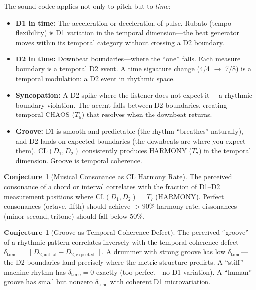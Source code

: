 \documentclass[11pt]{article}
\theoremstyle{definition}
\newtheorem{conjecture}[theorem]{Conjecture}
\theoremstyle{remark}
\begin{document}
The sound codec applies not only to pitch but to \emph{time}:

\begin{itemize}[nosep]
  \item \textbf{D1 in time:} The acceleration or deceleration of pulse.  Rubato
    (tempo flexibility) is D1 variation in the temporal dimension---the beat generator
    moves within its temporal category without crossing a D2 boundary.
  \item \textbf{D2 in time:} Downbeat boundaries---where the ``one'' falls.  Each
    measure boundary is a temporal D2 event.  A time signature change (4/4 $\to$ 7/8)
    is a temporal modulation: a D2 event in rhythmic space.
  \item \textbf{Syncopation:} A D2 spike where the listener does not expect it---
    a rhythmic boundary violation.  The accent falls between D2 boundaries, creating
    temporal CHAOS ($T_6$) that resolves when the downbeat returns.
  \item \textbf{Groove:} D1 is smooth and predictable (the rhythm ``breathes''
    naturally), and D2 lands on expected boundaries (the downbeats are where you
    expect them).  $\mathrm{CL}(D_1, D_2)$ consistently produces HARMONY ($T_7$)
    in the temporal dimension.  Groove is temporal coherence.
\end{itemize}

\begin{conjecture}[Musical Consonance as CL Harmony Rate]
The perceived consonance of a chord or interval correlates with the fraction of D1--D2
measurement positions where $\mathrm{CL}(D_1, D_2) = T_7$ (HARMONY).  Perfect
consonances (octave, fifth) should achieve $> 90\%$ harmony rate; dissonances
(minor second, tritone) should fall below $50\%$.
\end{conjecture}

\begin{conjecture}[Groove as Temporal Coherence Defect]
\label{conj:groove}
The perceived ``groove'' of a rhythmic pattern correlates inversely with the temporal
coherence defect $\delta_{\text{time}} = \|D_{2,\text{actual}} - D_{2,\text{expected}}\|$.
A drummer with strong groove has low $\delta_{\text{time}}$---the D2 boundaries land
precisely where the metric structure predicts.  A ``stiff'' machine rhythm has
$\delta_{\text{time}} = 0$ exactly (too perfect---no D1 variation).  A ``human'' groove
has small but nonzero $\delta_{\text{time}}$ with coherent D1 microvariation.
\end{conjecture}
\end{document}
